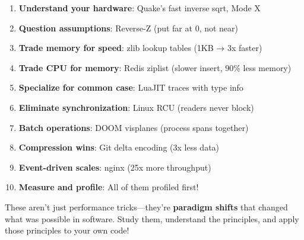 \begin{enumerate}
    \item \textbf{Understand your hardware}: Quake's fast inverse sqrt, Mode X
    \item \textbf{Question assumptions}: Reverse-Z (put far at 0, not near)
    \item \textbf{Trade memory for speed}: zlib lookup tables (1KB → 3x faster)
    \item \textbf{Trade CPU for memory}: Redis ziplist (slower insert, 90\% less memory)
    \item \textbf{Specialize for common case}: LuaJIT traces with type info
    \item \textbf{Eliminate synchronization}: Linux RCU (readers never block)
    \item \textbf{Batch operations}: DOOM visplanes (process spans together)
    \item \textbf{Compression wins}: Git delta encoding (3x less data)
    \item \textbf{Event-driven scales}: nginx (25x more throughput)
    \item \textbf{Measure and profile}: All of them profiled first!
\end{enumerate}

These aren't just performance tricks—they're \textbf{paradigm shifts} that changed what was possible in software. Study them, understand the principles, and apply those principles to your own code!
